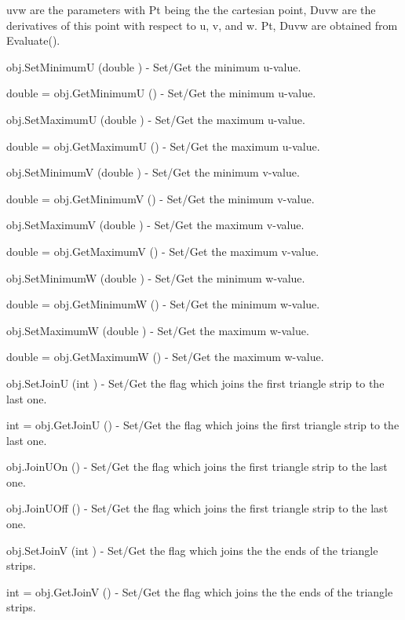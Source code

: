 \begin{DoxyItemize}
uvw are the parameters with Pt being the the cartesian point, Duvw are the derivatives of this point with respect to u, v, and w. Pt, Duvw are obtained from Evaluate().  
\item {\ttfamily obj.\-Set\-Minimum\-U (double )} -\/ Set/\-Get the minimum u-\/value.  
\item {\ttfamily double = obj.\-Get\-Minimum\-U ()} -\/ Set/\-Get the minimum u-\/value.  
\item {\ttfamily obj.\-Set\-Maximum\-U (double )} -\/ Set/\-Get the maximum u-\/value.  
\item {\ttfamily double = obj.\-Get\-Maximum\-U ()} -\/ Set/\-Get the maximum u-\/value.  
\item {\ttfamily obj.\-Set\-Minimum\-V (double )} -\/ Set/\-Get the minimum v-\/value.  
\item {\ttfamily double = obj.\-Get\-Minimum\-V ()} -\/ Set/\-Get the minimum v-\/value.  
\item {\ttfamily obj.\-Set\-Maximum\-V (double )} -\/ Set/\-Get the maximum v-\/value.  
\item {\ttfamily double = obj.\-Get\-Maximum\-V ()} -\/ Set/\-Get the maximum v-\/value.  
\item {\ttfamily obj.\-Set\-Minimum\-W (double )} -\/ Set/\-Get the minimum w-\/value.  
\item {\ttfamily double = obj.\-Get\-Minimum\-W ()} -\/ Set/\-Get the minimum w-\/value.  
\item {\ttfamily obj.\-Set\-Maximum\-W (double )} -\/ Set/\-Get the maximum w-\/value.  
\item {\ttfamily double = obj.\-Get\-Maximum\-W ()} -\/ Set/\-Get the maximum w-\/value.  
\item {\ttfamily obj.\-Set\-Join\-U (int )} -\/ Set/\-Get the flag which joins the first triangle strip to the last one.  
\item {\ttfamily int = obj.\-Get\-Join\-U ()} -\/ Set/\-Get the flag which joins the first triangle strip to the last one.  
\item {\ttfamily obj.\-Join\-U\-On ()} -\/ Set/\-Get the flag which joins the first triangle strip to the last one.  
\item {\ttfamily obj.\-Join\-U\-Off ()} -\/ Set/\-Get the flag which joins the first triangle strip to the last one.  
\item {\ttfamily obj.\-Set\-Join\-V (int )} -\/ Set/\-Get the flag which joins the the ends of the triangle strips.  
\item {\ttfamily int = obj.\-Get\-Join\-V ()} -\/ Set/\-Get the flag which joins the the ends of the triangle strips.  

\end{DoxyItemize}
